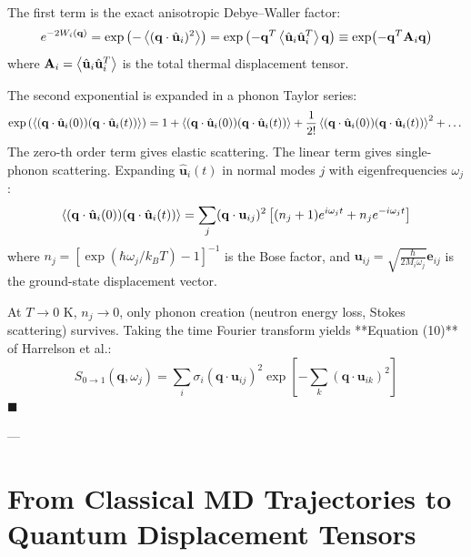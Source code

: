 \documentclass[11pt,a4paper]{article}
\theoremstyle{definition}
\begin{document}
The first term is the exact anisotropic Debye--Waller factor:
\begin{equation}
e^{-2W_i(\mathbf{q})} = \exp\left( -\ev{(\mathbf{q}\cdot \hat{\mathbf{u}}_i)^2} \right) = \exp\left( -\mathbf{q}^T \ev{\hat{\mathbf{u}}_i \hat{\mathbf{u}}_i^T} \mathbf{q} \right) \equiv \exp(-\mathbf{q}^T \mathbf{A}_i \mathbf{q})
\end{equation}
where $\mathbf{A}_i = \ev{\hat{\mathbf{u}}_i \hat{\mathbf{u}}_i^T}$ is the total thermal displacement tensor.

The second exponential is expanded in a phonon Taylor series:
\begin{equation}
\exp\left( \ev{(\mathbf{q}\cdot \hat{\mathbf{u}}_i(0))(\mathbf{q}\cdot \hat{\mathbf{u}}_i(t))} \right) = 1 + \ev{(\mathbf{q}\cdot \hat{\mathbf{u}}_i(0))(\mathbf{q}\cdot \hat{\mathbf{u}}_i(t))} + \frac{1}{2!} \ev{(\mathbf{q}\cdot \hat{\mathbf{u}}_i(0))(\mathbf{q}\cdot \hat{\mathbf{u}}_i(t))}^2 + \dots
\end{equation}
The zero-th order term gives elastic scattering. The linear term gives single-phonon scattering. Expanding $\hat{\mathbf{u}}_i(t)$ in normal modes $j$ with eigenfrequencies $\omega_j$:
\begin{equation}
\ev{(\mathbf{q}\cdot \hat{\mathbf{u}}_i(0))(\mathbf{q}\cdot \hat{\mathbf{u}}_i(t))} = \sum_j (\mathbf{q} \cdot \mathbf{u}_{ij})^2 \left[ (n_j + 1) e^{i\omega_j t} + n_j e^{-i\omega_j t} \right]
\end{equation}
where $n_j = [\exp(\hbar\omega_j / k_B T) - 1]^{-1}$ is the Bose factor, and $\mathbf{u}_{ij} = \sqrt{\frac{\hbar}{2 M_i \omega_j}} \mathbf{e}_{ij}$ is the ground-state displacement vector.

At $T \to 0\text{ K}$, $n_j \to 0$, only phonon creation (neutron energy loss, Stokes scattering) survives. Taking the time Fourier transform yields **Equation (10)** of Harrelson et al.:
\begin{equation}
S_{0 \to 1}(\mathbf{q}, \omega_j) = \sum_i \sigma_i (\mathbf{q} \cdot \mathbf{u}_{ij})^2 \exp\left[ -\sum_k (\mathbf{q} \cdot \mathbf{u}_{ik})^2 \right]
\label{eq:exact_s1}
\end{equation}
$\blacksquare$

---

\section{From Classical MD Trajectories to Quantum Displacement Tensors}
\label{sec:classical_to_quantum}
\end{document}
